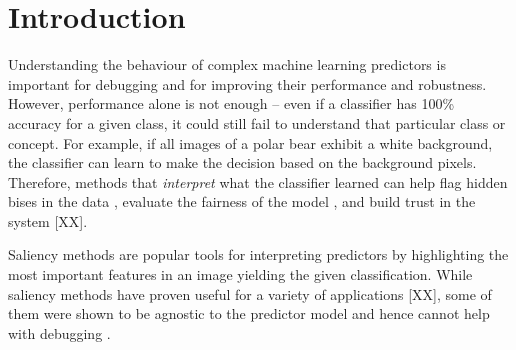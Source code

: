 \documentclass{article}
\begin{document}

\begin{abstract}
 
\end{abstract}

\section{Introduction}

Understanding the behaviour of complex machine learning predictors is important for debugging and for improving their performance and robustness. However, performance alone is not enough -- even if a classifier has 100\% accuracy for a given class, it could still fail to understand that particular class or concept. For example, if all images of a polar bear exhibit a white background, the classifier can learn to make the decision based on the background pixels. Therefore, methods that \emph{interpret} what the classifier learned can help flag hidden bises in the data \cite{buolamwini2018gender}, evaluate the fairness of the model \cite{doshi2017towards}, and build trust in the system [XX]. 

Saliency methods \cite{simonyan2013deep,springenberg2014striving,selvaraju2016grad,smilkov2017smoothgrad} are popular tools for interpreting predictors by highlighting the most important features in an image yielding the given classification. While saliency methods have proven useful for a variety of applications [XX], some of them were shown to be agnostic to the predictor model and hence cannot help with debugging \cite{adebayo2018sanity}. 
\end{document}
